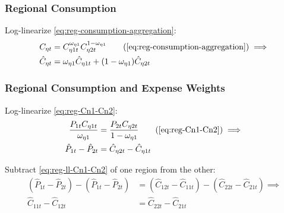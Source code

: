 \documentclass[../thesis.tex]{subfiles}
\begin{document}
\begin{tcolorbox}[colback=red!5!white,colframe=red!75!black]

\subsubsection*{Regional Consumption}
	
	Log-linearize \ref{eq:reg-consumption-aggregation}:
	\begin{align}
		C_{\eta t} &= C_{\eta 1 t}^{\omega_{\eta 1}} C_{\eta 2 t}^{1-\omega_{\eta 1}} \tag{\ref{eq:reg-consumption-aggregation}} \implies \\
		\hat{C}_{\eta t} &= \omega_{\eta 1} \hat{C}_{\eta 1 t} + (1-\omega_{\eta 1}) \hat{C}_{\eta 2 t} \label{eq:reg-ll-consumption-aggregation}
	\end{align}
	
\subsubsection*{Regional Consumption and Expense Weights}
	
	Log-linearize \ref{eq:reg-Cn1-Cn2}:
	\begin{align}
		\frac{P_{1 t} C_{\eta 1 t}}{\omega_{\eta 1}} &= \frac{P_{2 t} C_{\eta 2 t}}{1 -\omega_{\eta 1}} \tag{\ref{eq:reg-Cn1-Cn2}} \implies \\
		\hat{P}_{1 t} - \hat{P}_{2 t} &= \hat{C}_{\eta 2 t} - \hat{C}_{\eta 1 t} \label{eq:reg-ll-Cn1-Cn2}
	\end{align}
	
	Subtract \ref{eq:reg-ll-Cn1-Cn2} of one region from the other:
	\begin{align}
		(\hat{P}_{1 t} - \hat{P}_{2 t}) - (\hat{P}_{1 t} - \hat{P}_{2 t}) &= (\hat{C}_{12t} - \hat{C}_{11t}) - (\hat{C}_{22t} - \hat{C}_{21t}) \implies \nonumber \\
		\hat{C}_{11t} - \hat{C}_{12t} &= \hat{C}_{22t} - \hat{C}_{21t} \label{eq:reg-ll-Cn1-Cn2-b}
	\end{align}
	
\end{tcolorbox}
\end{document}
